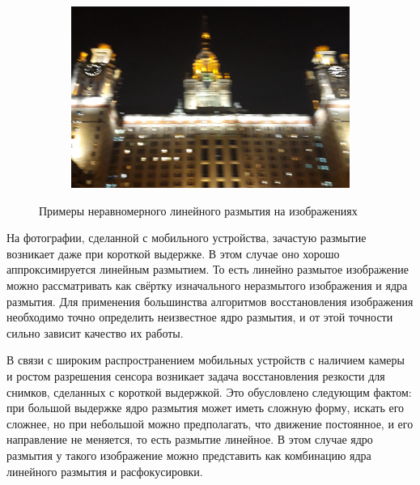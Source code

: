 \begin{figure}[h!]
\begin{subfigure}[b]{0.4\linewidth}
  \end{subfigure}
  \begin{subfigure}[b]{0.5\linewidth}
    \includegraphics[width=\linewidth]{pics/linear_motion_blur/mb0.jpg}
  \end{subfigure}
  \caption{Примеры неравномерного линейного размытия на изображениях}
  \label{fig:lblur}
\end{figure}

\par
На фотографии, сделанной с мобильного устройства, зачастую размытие возникает даже при короткой выдержке. В этом случае оно хорошо аппроксимируется линейным размытием. То есть линейно размытое изображение можно рассматривать как свёртку изначального неразмытого изображения и ядра размытия. Для применения большинства алгоритмов восстановления изображения необходимо точно определить неизвестное ядро размытия, и от этой точности сильно зависит качество их работы.
\par
В связи с широким распространением мобильных устройств с наличием камеры и ростом разрешения сенсора возникает задача восстановления резкости для снимков, сделанных с короткой выдержкой. Это обусловлено следующим фактом: при большой выдержке ядро размытия может иметь сложную форму, искать его сложнее, но при небольшой можно предполагать, что движение постоянное, и его направление не меняется, то есть размытие линейное. В этом случае ядро размытия у такого изображение можно представить как комбинацию ядра линейного размытия и расфокусировки. 


